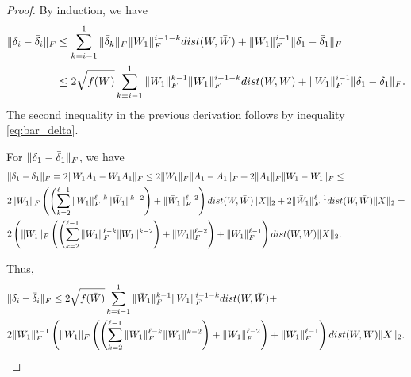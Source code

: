 \documentclass[10pt,a4paper]{amsart}
\begin{document}
\begin{proof}
By induction, we have
\begin{align*}
    \|\delta_i - \bar \delta_i\|_{\rm F} & \leq \sum_{k=i-1}^1 \|\bar \delta_k\|_{\rm F} \| W_1 \|_{\rm F}^{i-1-k} \textnormal{dist}(W,\bar W) + \|W_1\|_{\rm F}^{i-1} \| \delta_1 - \bar \delta_1\|_{\rm F} \\ & \leq 2 \sqrt{f(\bar W)} \sum_{k=i-1}^1  \|\bar W_1\|_{\rm F}^{k-1} \| W_1 \|_{\rm F}^{i-1-k} \textnormal{dist}(W,\bar W) + \|W_1\|_{\rm F}^{i-1} \| \delta_1 - \bar \delta_1\|_{\rm F}. 
\end{align*}
The second inequality in the previous derivation follows by inequality \eqref{eq:bar_delta}.

For $\|\delta_1-\bar \delta_1\|_{\rm F}$, we have
\begin{align*}
  &\|\delta_1-\bar \delta_1\|_{\rm F} = 2 \|W_1 A_1-\bar W_1 \bar A_1\|_{\rm F} \leq 2\|W_1\|_{\rm F}\|A_1-\bar A_1\|_{\rm F}+ 2 \|\bar A_1\|_{\rm F} \|W_1-\bar W_1\|_{\rm F} \leq \\ &  2\|W_1\|_{\rm F} \left(\left(\sum_{k=2}^{\ell-1} \|W_1\|_{\rm F}^{\ell-k} \|\bar W_1\|^{k-2}\right) + \|\bar W_1\|_{\rm F}^{\ell-2} \right) \textnormal{dist}(W,\bar W) \|X\|_2 + 2\|\bar W_1\|_{\rm F}^{\ell-1} \textnormal{dist}(W,\bar W) \|X\|_2 = \\ & 2\left(\|W_1\|_{\rm F} \left(\left(\sum_{k=2}^{\ell-1} \|W_1\|_{\rm F}^{\ell-k} \|\bar W_1\|^{k-2}\right) + \|\bar W_1\|_{\rm F}^{\ell-2} \right) + \|\bar W_1\|_{\rm F}^{\ell-1} \right) \textnormal{dist}(W,\bar W) \|X\|_2.
\end{align*}

Thus,
\begin{align}
\label{eq:eq8}
    &\|\delta_i - \bar \delta_i\|_{\rm F}  \nonumber \leq 2 \sqrt{f(\bar W)} \sum_{k=i-1}^1  \|\bar W_1\|_{\rm F}^{k-1} \| W_1 \|_{\rm F}^{i-1-k} \textnormal{dist}(W,\bar W) + \\& 2 \|W_1\|_{\rm F}^{i-1} \left(\|W_1\|_{\rm F} \left(\left(\sum_{k=2}^{\ell-1} \|W_1\|_{\rm F}^{\ell-k} \|\bar W_1\|^{k-2}\right) + \|\bar W_1\|_{\rm F}^{\ell-2} \right) + \|\bar W_1\|_{\rm F}^{\ell-1} \right) \textnormal{dist}(W,\bar W) \|X\|_2. 
\end{align}


\end{proof}
\end{document}
